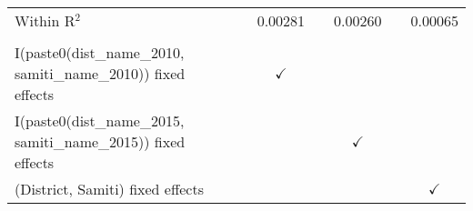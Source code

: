 \begin{tabular}{lcccccc}
   Within R$^2$                                                      &                & 0.00281       &                & 0.00260       &                       & 0.00065\\  
    \\
   I(paste0(dist\_name\_2010, samiti\_name\_2010)) fixed effects     &                & $\checkmark$  &                &               &                       & \\  
   I(paste0(dist\_name\_2015, samiti\_name\_2015)) fixed effects     &                &               &                & $\checkmark$  &                       & \\  
   (District, Samiti) fixed effects                                  &                &               &                &               &                       & $\checkmark$\\   
   \bottomrule
\end{tabular}
\par\endgroup



